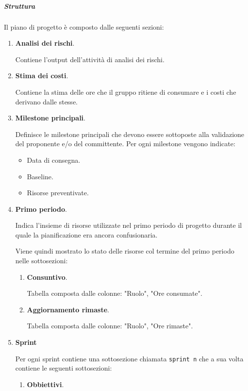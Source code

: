 \subparagraph{Struttura}
\label{subsec:struttura_piano}
Il piano di progetto è composto dalle seguenti sezioni:
\begin{enumerate}
    \item \textbf{Analisi dei rischi}.
    
    Contiene l'output dell'attività di analisi dei rischi.

    \item \textbf{Stima dei costi}.
    
    Contiene la stima delle ore che il gruppo ritiene di consumare e i costi che derivano dalle stesse. 
    
    \item \textbf{Milestone principali}.
    
    Definisce le milestone principali che devono essere sottoposte alla validazione del proponente e/o del committente.
    Per ogni milestone vengono indicate:
    \begin{itemize}
        \item Data di consegna.
        \item Baseline.
        \item Risorse preventivate.
    \end{itemize}
    
    \item \textbf{Primo periodo}.
    
    Indica l'insieme di risorse utilizzate nel primo periodo di progetto durante il quale la pianificazione era ancora confusionaria.
    
    Viene quindi mostrato lo stato delle risorse col termine del primo periodo nelle sottosezioni:
    \begin{enumerate}
        \item \textbf{Consuntivo}.
        
        Tabella composta dalle colonne: "Ruolo", "Ore consumate".

        \item \textbf{Aggiornamento rimaste}.
        
        Tabella composta dalle colonne: "Ruolo", "Ore rimaste".
    \end{enumerate}
    
    \item \textbf{Sprint}
    
    Per ogni sprint contiene una sottosezione chiamata \texttt{sprint n} che a sua volta contiene le seguenti sottosezioni:
    \begin{enumerate}
        \item \textbf{Obbiettivi}.
        

\end{enumerate}
\end{enumerate}
